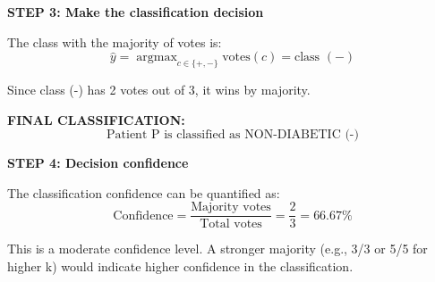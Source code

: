 \documentclass[12pt]{article}
\DeclareMathOperator{\argmax}{argmax}
\begin{document}
\begin{solution}
\textbf{STEP 3: Make the classification decision}

The class with the majority of votes is:
\[
\hat{y} = \argmax_{c \in \{+, -\}} \text{votes}(c) = \text{class } (-)
\]

Since class (-) has 2 votes out of 3, it wins by majority.

\textbf{FINAL CLASSIFICATION:}
\[
\boxed{\text{Patient P is classified as NON-DIABETIC (-)}}
\]

\textbf{STEP 4: Decision confidence}

The classification confidence can be quantified as:
\[
\text{Confidence} = \frac{\text{Majority votes}}{\text{Total votes}} = \frac{2}{3} = 66.67\%
\]

This is a moderate confidence level. A stronger majority (e.g., 3/3 or 5/5 for higher k) would indicate higher confidence in the classification.
\end{solution}
\end{document}
